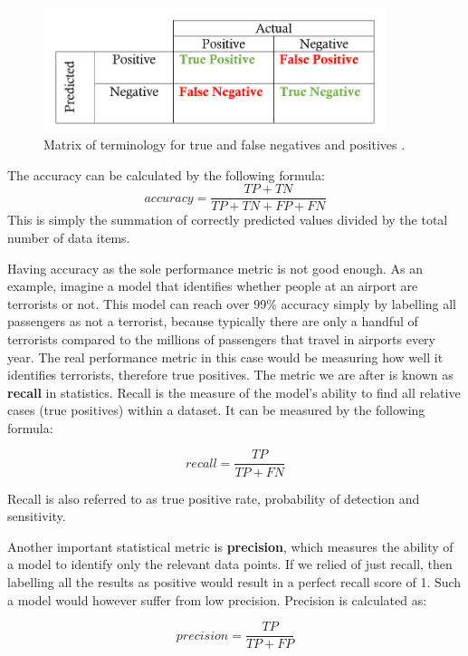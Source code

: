 \documentclass{UoYCSproject}
\begin{document}
\begin{figure}[h]
\includegraphics[width=10cm]{tptnfpfn.png}
\centering
\caption{Matrix of terminology for true and false negatives and positives \cite{precisionandrecall}.} 
\label{fig:tptnfpfn}
\end{figure}

The accuracy can be calculated by the following formula: 
\begin{equation}
\label{eq:accuracy}
accuracy=\frac{TP + TN}{TP + TN + FP + FN}
\end{equation}
This is simply the summation of correctly predicted values divided by the total number of data items.

Having accuracy as the sole performance metric is not good enough. As an example, imagine a model that identifies whether people at an airport are terrorists or not. This model can reach over $99$\% accuracy simply by labelling all passengers as not a terrorist, because typically there are only a handful of terrorists compared to the millions of passengers that travel in airports every year. The real performance metric in this case would be measuring how well it identifies terrorists, therefore true positives. The metric we are after is known as \textbf{recall} in statistics. Recall is the measure of the model's ability to find all relative cases (true positives) within a dataset. It can be measured by the following formula:

\begin{equation}
recall=\frac{TP}{TP + FN}
\end{equation}

Recall is also referred to as true positive rate, probability of detection and sensitivity.  

Another important statistical metric is \textbf{precision}, which measures the ability of a model to identify only the relevant data points. If we relied of just recall, then labelling all the results as positive would result in a perfect recall score of 1. Such a model would however suffer from low precision. Precision is calculated as:

\begin{equation}
precision=\frac{TP}{TP + FP}
\end{equation}
\end{document}
